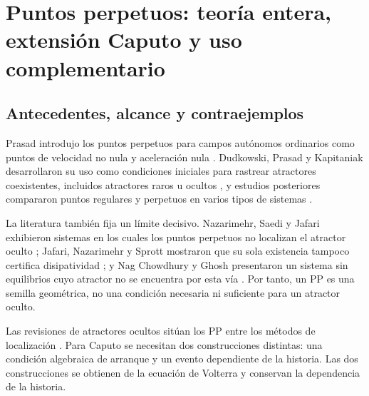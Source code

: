 \section[Puntos perpetuos enteros y extensiones Caputo]
{Puntos perpetuos: teoría entera, extensión Caputo y uso complementario}
\label{sec:perpetual-points}

\HAFOCardPerpetual

\subsection{Antecedentes, alcance y contraejemplos}

Prasad introdujo los puntos perpetuos para campos autónomos ordinarios como
puntos de velocidad no nula y aceleración nula
\cite{Prasad2015Perpetual}. Dudkowski, Prasad y Kapitaniak desarrollaron su uso
como condiciones iniciales para rastrear atractores coexistentes, incluidos
atractores raros u ocultos
\cite{DudkowskiPrasadKapitaniak2015,DudkowskiPrasadKapitaniak2017}, y estudios
posteriores compararon puntos regulares y perpetuos en varios tipos de
sistemas \cite{DudkowskiPrasadKapitaniak2018}.

La literatura también fija un límite decisivo. Nazarimehr, Saedi y Jafari
exhibieron sistemas en los cuales los puntos perpetuos no localizan el
atractor oculto \cite{NazarimehrSaediJafari2017}; Jafari, Nazarimehr y Sprott
mostraron que su sola existencia tampoco certifica disipatividad
\cite{JafariNazarimehrSprott2015}; y Nag Chowdhury y Ghosh presentaron un
sistema sin equilibrios cuyo atractor no se encuentra por esta vía
\cite{NagChowdhuryGhosh2020}. Por tanto, un PP es una semilla geométrica, no
una condición necesaria ni suficiente para un atractor oculto.

Las revisiones de atractores ocultos sitúan los PP entre los métodos de
localización \cite{DudkowskiEtAl2016,GuanXie2025}. Para Caputo se necesitan
dos construcciones distintas: una condición algebraica de arranque y un evento
dependiente de la historia. Las dos construcciones se obtienen de la ecuación de Volterra y conservan
la dependencia de la historia.

